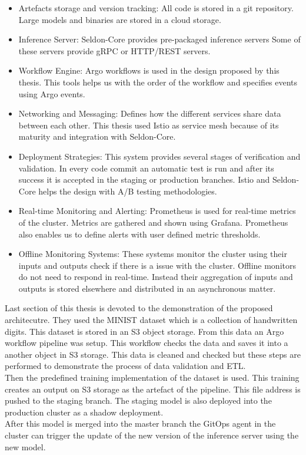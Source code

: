 \documentclass[a4paper, 10pt]{article}
\theoremstyle{nonumberplain}
\begin{document}
\begin{itemize}
    \item Artefacts storage and version tracking: All code is stored in a git
        repository. Large models and binaries are stored in a cloud storage.
    \item Inference Server: Seldon-Core provides pre-packaged inference servers
        Some of these servers provide gRPC or HTTP/REST servers.
    \item Workflow Engine: Argo workflows is used in the design proposed by
        this thesis. This tools helps us with the order of the workflow
        and specifies events using Argo events.
    \item Networking and Messaging: Defines how the different services
        share data between each other. This thesis used Istio as service mesh
        because of its maturity and integration with Seldon-Core.
    \item Deployment Strategies: This system provides several stages of
        verification and validation. In every code commit an automatic test
        is run and after its success it is accepted in the staging or
        production branches. Istio and Seldon-Core helps the design with
        A/B testing methodologies.
    \item Real-time Monitoring and Alerting: Prometheus is used for real-time
        metrics of the cluster. Metrics are gathered and shown
        using Grafana. Prometheus also enables us to define alerts with
        user defined metric thresholds.
    \item Offline Monitoring Systems: These systems monitor the cluster using
        their inputs and outputs check if there is a issue with the cluster.
        Offline monitors do not need to respond in real-time. Instead their
        aggregation of inputs and outputs is stored elsewhere and distributed
        in an asynchronous matter.
\end{itemize}

Last section of this thesis is devoted to the demonstration of the proposed
architecutre. They used the MINIST dataset which is a collection of handwritten
digits. This dataset is stored in an S3 object storage. From this data
an Argo workflow pipeline was setup. This workflow checks the data and saves
it into a another object in S3 storage. This data is cleaned and checked
but these steps are performed to demonstrate the process of data validation
and ETL. \\
Then the predefined training implementation of the dataset is used. This
training creates an output on S3 storage as the artefact of the pipeline.
This file address is pushed to the staging branch. The staging model is also
deployed into the production cluster as a shadow deployment. \\
After this model is merged into the master branch the GitOps agent in the
cluster can trigger the update of the new version of the inference server using
the new model. \\
\end{document}
